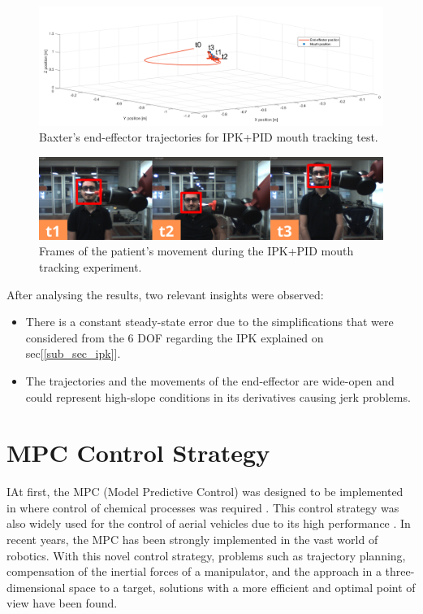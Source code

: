 \documentclass[11pt]{report} %
\begin{document}
\begin{figure}[H]
    \centering
    \includegraphics[width=1.0\linewidth]{assets/imgs/control_theory/pid_tracking/general_view.png}
    \caption{Baxter's end-effector trajectories for IPK+PID mouth tracking test.} 
    \label{fig_general_view_pid_tracking_experiments}
\end{figure}

\begin{figure}[H]
    \centering
    \includegraphics[width=1.0\linewidth]{assets/imgs/control_theory/pid_tracking/real_pid_tracking.png}
    \caption{Frames of the patient's movement during the IPK+PID mouth tracking experiment.} 
    \label{fig_real_pid_mouth_tracking_experiments}
\end{figure}

After analysing the results, two relevant insights were observed:

\begin{itemize}
    \item There is a constant steady-state error due to the simplifications that were considered from the 6 DOF regarding the IPK explained on sec[\ref{sub_sec_ipk}]. 
    \item The trajectories and the movements of the end-effector are wide-open and could represent high-slope conditions in its derivatives causing jerk problems. 
\end{itemize}

\section{MPC Control Strategy} \label{cite_mpc_section}

IAt first, the MPC (Model Predictive Control) was designed to be implemented in where control of chemical processes was required \citep{cite_model_predictive_control_theory_and_practice}. This control strategy was also widely used for the control of aerial vehicles due to its high performance \citep{cite_receding_horizon_control_aerial_vehicles}. In recent years, the MPC has been strongly implemented in the vast world of robotics. With this novel control strategy, problems such as trajectory planning, compensation of the inertial forces of a manipulator, and the approach in a three-dimensional space to a target, solutions with a more efficient and optimal point of view have been found. \\
\end{document}
